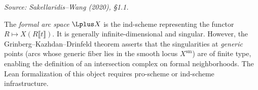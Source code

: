 \begin{definition}
  \label{def:arc-space}
  \textit{Source: Sakellaridis--Wang (2020), §1.1.}

  The \emph{formal arc space} \( \Lplus X \) is the ind-scheme representing the functor
  \( R \mapsto X(R\llbracket t \rrbracket) \).
  It is generally infinite-dimensional and singular.
  However, the Grinberg--Kazhdan--Drinfeld theorem asserts that the singularities at
  \emph{generic} points (arcs whose generic fiber lies in the smooth locus \( X^{\mathrm{sm}} \))
  are of finite type, enabling the definition of an intersection complex on formal neighborhoods.
  The Lean formalization of this object requires pro-scheme or ind-scheme infrastructure.
\end{definition}

